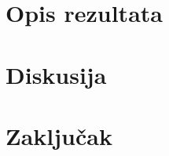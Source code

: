 \documentclass[conference]{IEEEtran}
\begin{document}
\section{Opis rezultata}

\section{Diskusija}

\section{Zaključak}



\vspace{12pt}
\end{document}
